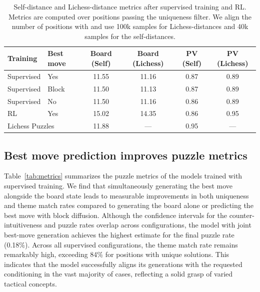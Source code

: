 \documentclass[letterpaper]{article} %
\begin{document}
\begin{table}[t]
    \centering
    \caption{Self-distance and Lichess-distance metrics after supervised training and RL. Metrics are computed over positions passing the uniqueness filter. We align the number of positions with \cite{feng2025generatingcreativechesspuzzles} and use 100k samples for Lichess-distances and 40k samples for the self-distances.}
    \label{tab:distances}
    \begin{tabular}{llcccc}
        \toprule
        Training                            & Best move & Board (Self) & Board (Lichess) & PV (Self) & PV (Lichess) \\
        \midrule
        Supervised                          & Yes       & 11.55        & 11.16           & 0.87      & 0.89         \\
        Supervised                          & Block     & 11.50        & 11.13           & 0.87      & 0.89         \\
        Supervised                          & No        & 11.50        & 11.16           & 0.86      & 0.89         \\
        RL                                  & Yes       & 15.02        & 14.35           & 0.86      & 0.95         \\
        \midrule
        \multicolumn{2}{l}{Lichess Puzzles} & 11.88     & —            & 0.95            & —                        \\
        \bottomrule
    \end{tabular}
\end{table}

\subsection{Best move prediction improves puzzle metrics}
Table~\ref{tab:metrics} summarizes the puzzle metrics of the models trained with supervised training. We find that simultaneously generating the best move alongside the board state leads to measurable improvements in both uniqueness and theme match rates compared to generating the board alone or predicting the best move with block diffusion. Although the confidence intervals for the counter-intuitiveness and puzzle rates overlap across configurations, the model with joint best-move generation achieves the highest estimate for the final puzzle rate (0.18\%). Across all supervised configurations, the theme match rate remains remarkably high, exceeding 84\% for positions with unique solutions. This indicates that the model successfully aligns its generations with the requested conditioning in the vast majority of cases, reflecting a solid grasp of varied tactical concepts.
\end{document}
